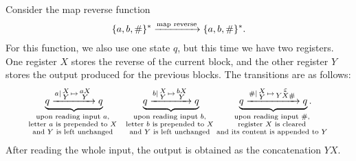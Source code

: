 \begin{myexample}
    \label{example:map-reverse-function-sst}
    Consider the map reverse function
    \begin{align*}
    \{a,b,\#\}^* 
    \xrightarrow {\text{map reverse}}
    \{a,b,\#\}^*.
    \end{align*}
    For this function, we also use one state $q$, but this time we have two registers. One register $X$ stores the reverse of the current block, and the other register $Y$ stores the output produced for the previous blocks. The transitions are as follows:
\begin{align*}
     \myunderbrace{
         q
        \xrightarrow {a \mid 
        \begin{smallmatrix}
            X \\ 
            Y
        \end{smallmatrix}
        \mapsto 
        \begin{smallmatrix}
            aX \\ 
            Y
        \end{smallmatrix}}
        q 
     }
     {upon reading input $a$, \\ letter $a$ is prepended to $X$ \\ and $Y$ is left unchanged}\qquad \qquad 
     \myunderbrace{
         q
        \xrightarrow {b \mid 
        \begin{smallmatrix}
            X \\ 
            Y
        \end{smallmatrix}
        \mapsto 
        \begin{smallmatrix}
            bX \\ 
            Y
        \end{smallmatrix}}
        q 
     }
     {upon reading input $b$, \\ letter $b$ is prepended to $X$ \\ and $Y$ is left unchanged}
        \qquad \qquad
        \myunderbrace{
            q           \xrightarrow {\# \mid 
        \begin{smallmatrix}            X \\ 
            Y
        \end{smallmatrix}        \mapsto 
        \begin{smallmatrix}            \varepsilon \\ 
            YX\#
        \end{smallmatrix}}
        q
     }
     {upon reading input $\#$, \\ register $X$ is cleared \\ and its content is appended to $Y$}.
    \end{align*}
    After reading the whole input, the output is obtained as the concatenation $YX$.  
\end{myexample}

